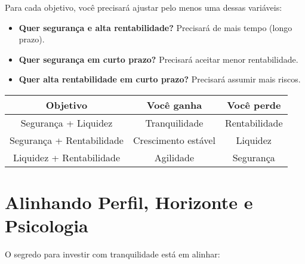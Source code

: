 \vspace{0.3cm}
\noindent Para cada objetivo, você precisará ajustar pelo menos uma dessas variáveis:
\begin{itemize}[leftmargin=*]
    \item \textbf{Quer segurança e alta rentabilidade?} Precisará de mais tempo (longo prazo).
    \item \textbf{Quer segurança em curto prazo?} Precisará aceitar menor rentabilidade.
    \item \textbf{Quer alta rentabilidade em curto prazo?} Precisará assumir mais riscos.
\end{itemize}
\begin{center}
\begin{tabular}{|c|c|c|}
\hline
\textbf{Objetivo} & \textbf{Você ganha} & \textbf{Você perde} \\
\hline
Segurança + Liquidez & Tranquilidade & Rentabilidade \\
\hline
Segurança + Rentabilidade & Crescimento estável & Liquidez \\
\hline
Liquidez + Rentabilidade & Agilidade & Segurança \\
\hline
\end{tabular}
\end{center}

\vspace{0,3cm} %
\begin{center}
\end{center}
\section{Alinhando Perfil, Horizonte e Psicologia}

\noindent O segredo para investir com tranquilidade está em alinhar:

